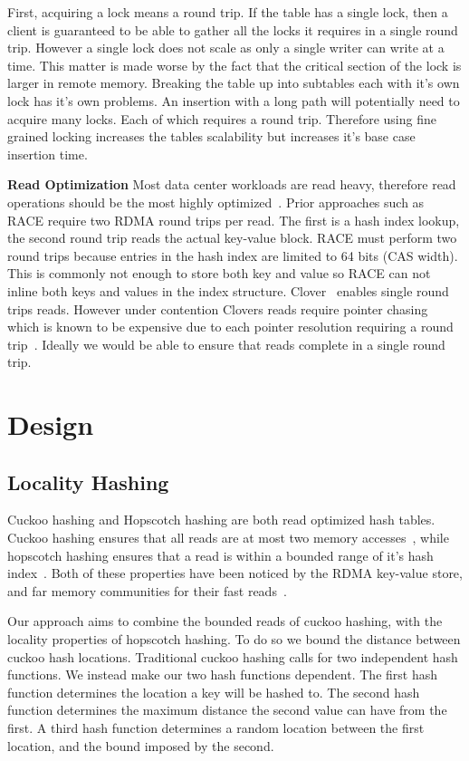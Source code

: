 First, acquiring a lock means a round trip. If the table has
a single lock, then a client is guaranteed to be able to
gather all the locks it requires in a single round trip.
However a single lock does not scale as only a single writer
can write at a time. This matter is made worse by the fact
that the critical section of the lock is larger in remote
memory. Breaking the table up into subtables each with it's
own lock has it's own problems. An insertion with a long
path will potentially need to acquire many locks. Each of
which requires a round trip. Therefore using fine grained
locking increases the tables scalability but increases it's
base case insertion time.

\textbf{Read Optimization} Most data center workloads are
read heavy, therefore read operations should be the most
highly optimized~\cite{datacenter-workloads}. Prior
approaches such as RACE require two RDMA round trips per
read. The first is a hash index lookup, the second round
trip reads the actual key-value block. RACE must perform two
round trips because entries in the hash index are limited to
64 bits (CAS width). This is commonly not enough to store
both key and value so RACE can not inline both keys and
values in the index structure. Clover~\cite{clover} enables
single round trips reads. However under contention Clovers
reads require pointer chasing which is known to be expensive
due to each pointer resolution requiring a round
trip~\cite{clio,clover,pointer-chaising}. Ideally we would
be able to ensure that reads complete in a single round
trip.


\section{Design}
\label{sec:design}

\subsection{Locality Hashing}

Cuckoo hashing and Hopscotch hashing are both read optimized
hash tables. Cuckoo hashing ensures that all reads are at
most two memory accesses~\cite{cuckoo}, while hopscotch
hashing ensures that a read is within a bounded range of
it's hash index~\cite{hopscotch}. Both of these properties
have been noticed by the RDMA key-value store, and far
memory communities for their fast
reads~\cite{memc3,cuckoo-improvements,pilaf,farm}.

Our approach aims to combine the bounded reads of cuckoo
hashing, with the locality properties of hopscotch hashing.
To do so we bound the distance between cuckoo hash
locations. Traditional cuckoo hashing calls for two
independent hash functions. We instead make our two hash
functions dependent. The first hash function determines the
location a key will be hashed to. The second hash function
determines the maximum distance the second value can have
from the first. A third hash function determines a random
location between the first location, and the bound imposed by
the second.

